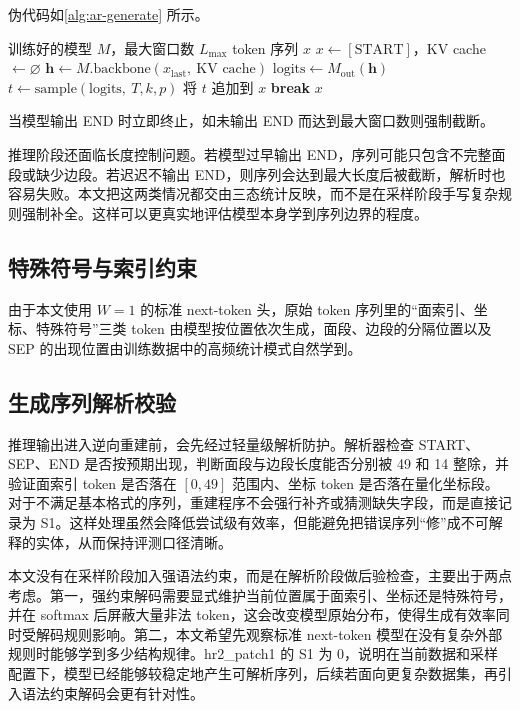 伪代码如\autoref{alg:ar-generate} 所示。

\begin{algorithm}[htbp]
    \caption{自回归序列生成（$W = 1$ 主干 next-token 分支）}
    \label{alg:ar-generate}
    \begin{algorithmic}[1]
        \Require 训练好的模型 $M$，最大窗口数 $L_{\max}$
        \Ensure token 序列 $x$
        \State $x \gets [\text{START}]$，KV cache $\gets \varnothing$
            \State $\mathbf{h} \gets M.\text{backbone}(x_{\text{last}},\ \text{KV cache})$
            \State $\text{logits} \gets M_{\mathrm{out}}(\mathbf{h})$
            \State $t \gets \text{sample}(\text{logits},\ T, k, p)$
            \State 将 $t$ 追加到 $x$
             \State \textbf{break} \EndIf
        \EndWhile
        \State \Return $x$
    \end{algorithmic}
\end{algorithm}

当模型输出 END 时立即终止，如未输出 END 而达到最大窗口数则强制截断。

推理阶段还面临长度控制问题。若模型过早输出 END，序列可能只包含不完整面段或缺少边段。若迟迟不输出 END，则序列会达到最大长度后被截断，解析时也容易失败。本文把这两类情况都交由三态统计反映，而不是在采样阶段手写复杂规则强制补全。这样可以更真实地评估模型本身学到序列边界的程度。

\subsection{特殊符号与索引约束}

由于本文使用 $W = 1$ 的标准 next-token 头，原始 token 序列里的“面索引、坐标、特殊符号”三类 token 由模型按位置依次生成，面段、边段的分隔位置以及 SEP 的出现位置由训练数据中的高频统计模式自然学到。

\subsection{生成序列解析校验}

推理输出进入逆向重建前，会先经过轻量级解析防护。解析器检查 START、SEP、END 是否按预期出现，判断面段与边段长度能否分别被 49 和 14 整除，并验证面索引 token 是否落在 $[0,49]$ 范围内、坐标 token 是否落在量化坐标段。对于不满足基本格式的序列，重建程序不会强行补齐或猜测缺失字段，而是直接记录为 S1。这样处理虽然会降低尝试级有效率，但能避免把错误序列“修”成不可解释的实体，从而保持评测口径清晰。

本文没有在采样阶段加入强语法约束，而是在解析阶段做后验检查，主要出于两点考虑。第一，强约束解码需要显式维护当前位置属于面索引、坐标还是特殊符号，并在 softmax 后屏蔽大量非法 token，这会改变模型原始分布，使得生成有效率同时受解码规则影响。第二，本文希望先观察标准 next-token 模型在没有复杂外部规则时能够学到多少结构规律。hr2\_patch1 的 S1 为 0，说明在当前数据和采样配置下，模型已经能够较稳定地产生可解析序列，后续若面向更复杂数据集，再引入语法约束解码会更有针对性。

